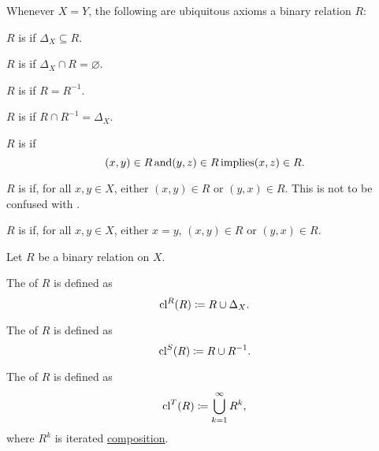 \begin{definition}
  Whenever \( X = Y \), the following are ubiquitous axioms a binary relation \( R \):
  \begin{defenum}[resume=def:binary_relation]
     \( R \) is  if \( \Delta_X \subseteq R \).

     \( R \) is  if \( \Delta_X \cap R = \varnothing \).

     \( R \) is  if \( R = R^{-1} \).

     \( R \) is  if \( R \cap R^{-1} = \Delta_X \).

     \( R \) is  if
    \begin{equation*}
      (x, y) \in R \mathop{\text{and}} (y, z) \in R \mathop{\text{implies}} (x, z) \in R.
    \end{equation*}

     \( R \) is  if, for all \( x, y \in X \), either \( (x, y) \in R \) or \( (y, x) \in R \). This is not to be confused with .

     \( R \) is  if, for all \( x, y \in X \), either \( x = y \), \( (x, y) \in R \) or \( (y, x) \in R \).
  \end{defenum}
\end{definition}

\begin{definition}\label{def:derived_relations}
  Let \( R \) be a binary relation on \( X \).

  \begin{defenum}
     The  of \( R \) is defined as
    \begin{equation*}
      \operatorname{cl}^R(R) \coloneqq R \cup \Delta_X.
    \end{equation*}

     The  of \( R \) is defined as
    \begin{equation*}
      \operatorname{cl}^S(R) \coloneqq R \cup R^{-1}.
    \end{equation*}

     The  of \( R \) is defined as
    \begin{equation*}
      \operatorname{cl}^T(R) \coloneqq \bigcup_{k=1}^\infty R^k,
    \end{equation*}
    where \( R^k \) is iterated \hyperref[def:binary_relation/composition]{composition}.
  \end{defenum}
\end{definition}

